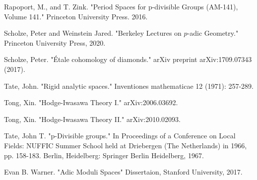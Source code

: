 \documentclass[12pt]{article}
\begin{document}
\begin{thebibliography}{}
 Rapoport, M., and  T. Zink. "Period Spaces for p-divisible Groups (AM-141), Volume 141." Princeton University Press. 2016.

 Scholze, Peter and Weinstein Jared. "Berkeley Lectures on $p$-adic Geometry." Princeton University Press, 2020.

 Scholze, Peter. "\'Etale cohomology of diamonds." arXiv preprint arXiv:1709.07343 (2017).

 Tate, John. "Rigid analytic spaces." Inventiones mathematicae 12 (1971): 257-289.

 Tong, Xin. "Hodge-Iwasawa Theory I." arXiv:2006.03692.

 Tong, Xin. "Hodge-Iwasawa Theory II." arXiv:2010.02093.

 Tate, John T. "p-Divisible groups." In Proceedings of a Conference on Local Fields: NUFFIC Summer School held at Driebergen (The Netherlands) in 1966, pp. 158-183. Berlin, Heidelberg: Springer Berlin Heidelberg, 1967.

 Evan B. Warner. "Adic Moduli Spaces" Dissertaion, Stanford University, 2017.


\end{thebibliography}
\end{document}
